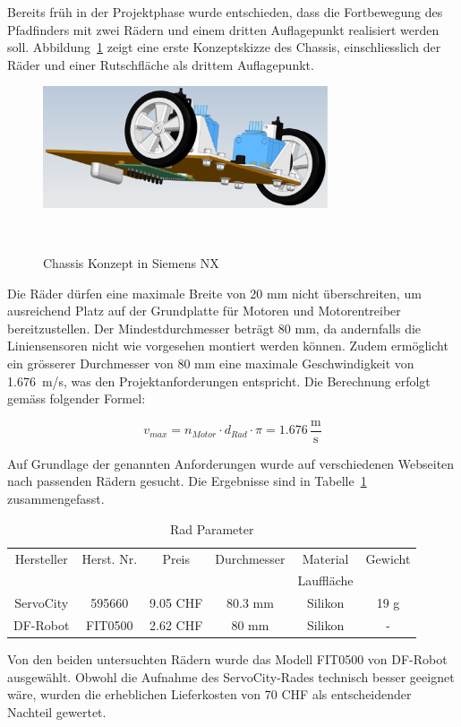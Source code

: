 \documentclass[main.tex]{subfiles} %
\begin{document}
Bereits früh in der Projektphase wurde entschieden, dass die Fortbewegung des
Pfadfinders mit zwei Rädern und einem dritten Auflagepunkt realisiert werden
soll. Abbildung~\ref{fig:Radkonzept} zeigt eine erste Konzeptskizze des
Chassis, einschliesslich der Räder und einer Rutschfläche als drittem
Auflagepunkt.

\begin{figure}[H]
    \centering
    \includegraphics[width=0.75\textwidth]{Radkonzept.pdf}
    \caption{Chassis Konzept in Siemens NX}~\label{fig:Radkonzept}
\end{figure}

Die Räder dürfen eine maximale Breite von 20 mm nicht überschreiten, um
ausreichend Platz auf der Grundplatte für Motoren und Motorentreiber
bereitzustellen. Der Mindestdurchmesser beträgt 80 mm, da andernfalls die
Liniensensoren nicht wie vorgesehen montiert werden können. Zudem ermöglicht
ein grösserer Durchmesser von 80 mm eine maximale Geschwindigkeit von
1.676~m/s, was den Projektanforderungen entspricht. Die Berechnung erfolgt
gemäss folgender Formel:

\[ v_{max} = n_{Motor} \cdot d_{Rad} \cdot \pi = 1.676 \, \frac{\text{m}}{\text{s}} \]

Auf Grundlage der genannten Anforderungen wurde auf verschiedenen Webseiten
nach passenden Rädern gesucht. Die Ergebnisse sind in
Tabelle~\ref{tab:Rad_Parameter} zusammengefasst.

\begin{table}[h]                                    %
    \centering
    \begin{tabular}{|c|c|c|c|c|c|}                        %
        \hline
        Hersteller & Herst. Nr. & Preis    & Durchmesser & Material   & Gewicht \\
                   &            &          &             & Lauffläche &         \\ \hline
        ServoCity  & 595660     & 9.05 CHF & 80.3 mm     & Silikon    & 19 g    \\ \hline
        DF-Robot   & FIT0500    & 2.62 CHF & 80 mm       & Silikon    & -       \\ \hline
    \end{tabular}
    \caption{Rad Parameter}
    \label{tab:Rad_Parameter}
\end{table}

Von den beiden untersuchten Rädern wurde das Modell FIT0500 von DF-Robot ausgewählt.
Obwohl die Aufnahme des ServoCity-Rades technisch besser geeignet wäre, wurden die
erheblichen Lieferkosten von 70 CHF als entscheidender Nachteil gewertet.
\end{document}
